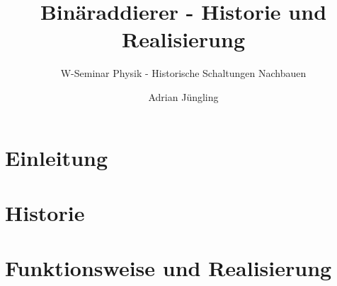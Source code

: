 \documentclass[parskip = half*,numbers=noenddot,12pt]{scrartcl}
\title{Binäraddierer - Historie und Realisierung}
\subtitle{W-Seminar Physik - Historische Schaltungen Nachbauen}
\author{Adrian Jüngling}
\begin{document}
	
	
	
	\maketitle
	\newpage
	\tableofcontents
	\newpage
	
	\section{Einleitung}
	
	
	\section{Historie}
	
	
	\section{Funktionsweise und Realisierung}
	
	
	\newpage
	
\end{document}
